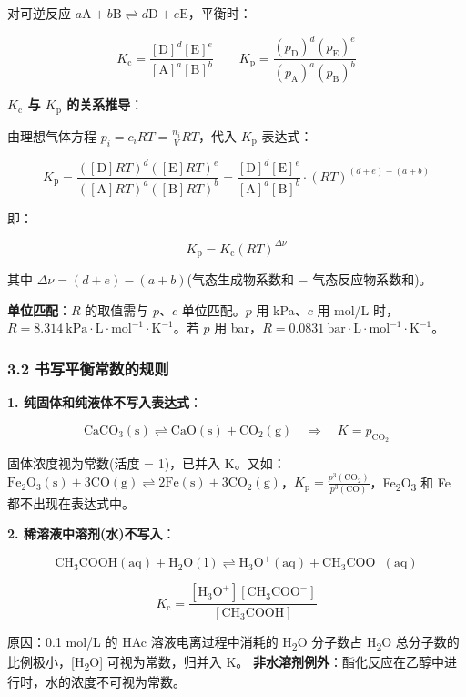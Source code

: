 对可逆反应 \(a\mathrm{A} + b\mathrm{B} \rightleftharpoons d\mathrm{D} + e\mathrm{E}\)，平衡时：

\[
K_{\mathrm c} = \frac{[\mathrm{D}]^d[\mathrm{E}]^e}{[\mathrm{A}]^a[\mathrm{B}]^b} \qquad K_{\mathrm p} = \frac{(p_\mathrm{D})^d(p_\mathrm{E})^e}{(p_\mathrm{A})^a(p_\mathrm{B})^b}
\]

\textbf{\(K_{\mathrm c}\) 与 \(K_{\mathrm p}\) 的关系推导}：

由理想气体方程 \(p_i = c_i RT = \frac{n_i}{V}RT\)，代入 \(K_{\mathrm p}\) 表达式：

\[
K_{\mathrm p} = \frac{([\mathrm{D}]RT)^d([\mathrm{E}]RT)^e}{([\mathrm{A}]RT)^a([\mathrm{B}]RT)^b} = \frac{[\mathrm{D}]^d[\mathrm{E}]^e}{[\mathrm{A}]^a[\mathrm{B}]^b} \cdot (RT)^{(d+e)-(a+b)}
\]

即：

\[
\boxed{K_{\mathrm p} = K_{\mathrm c}(RT)^{\Delta\nu}}
\]

其中 \(\Delta\nu = (d+e) - (a+b)\)(气态生成物系数和 − 气态反应物系数和)。

\textbf{单位匹配}：\(R\) 的取值需与 \(p\)、\(c\) 单位匹配。\(p\) 用 kPa、\(c\) 用 mol/L 时，\(R = 8.314\ \mathrm{kPa \cdot L \cdot mol^{-1} \cdot K^{-1}}\)。若 \(p\) 用 bar，\(R = 0.0831\ \mathrm{bar \cdot L \cdot mol^{-1} \cdot K^{-1}}\)。

\subsubsection{3.2 书写平衡常数的规则}\label{ux4e66ux5199ux5e73ux8861ux5e38ux6570ux7684ux89c4ux5219}

\textbf{1. 纯固体和纯液体不写入表达式}：

\[
\mathrm{CaCO_3(s) \rightleftharpoons CaO(s) + CO_2(g)} \quad \Rightarrow \quad K = p_{\mathrm{CO_2}}
\]

固体浓度视为常数(活度 = 1)，已并入 K。又如：\(\mathrm{Fe_2O_3(s) + 3CO(g) \rightleftharpoons 2Fe(s) + 3CO_2(g)}\)，\(K_{\mathrm p} = \frac{p^3(\mathrm{CO_2})}{p^3(\mathrm{CO})}\)，Fe\textsubscript{2}O\textsubscript{3} 和 Fe 都不出现在表达式中。

\textbf{2. 稀溶液中溶剂(水)不写入}：

\[
\mathrm{CH_3COOH(aq) + H_2O(l) \rightleftharpoons H_3O^+(aq) + CH_3COO^-(aq)}
\]

\[
K_{\mathrm c} = \frac{[\mathrm{H_3O^+}][\mathrm{CH_3COO^-}]}{[\mathrm{CH_3COOH}]}
\]

原因：0.1 mol/L 的 HAc 溶液电离过程中消耗的 H\textsubscript{2}O 分子数占 H\textsubscript{2}O 总分子数的比例极小，{[}H\textsubscript{2}O{]} 可视为常数，归并入 K。
\textbf{非水溶剂例外}：酯化反应在乙醇中进行时，水的浓度不可视为常数。

